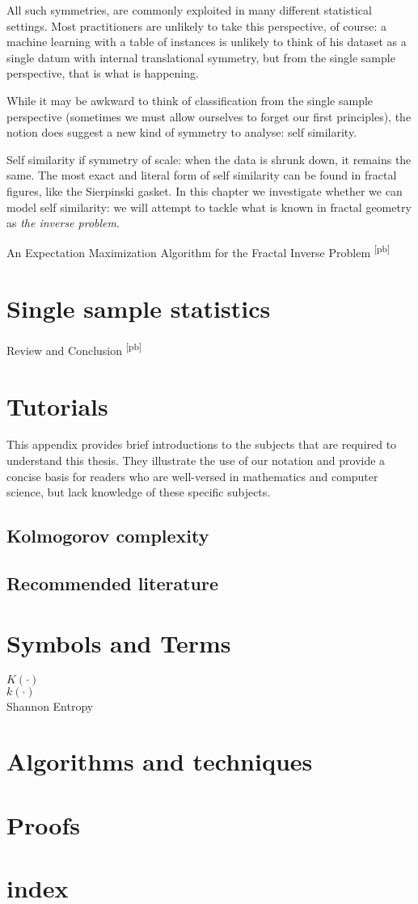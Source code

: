 \documentclass{thesis}
\newcommand{\pb}[1]{\textcolor{OliveGreen}{\small #1 \textsuperscript{[pb]} }}
\begin{document}
All such symmetries, are commonly exploited in many different statistical settings. Most practitioners are unlikely to take this perspective, of course: a machine learning with a table of instances is unlikely to think of his dataset as a single datum with internal translational symmetry, but from the single sample perspective, that is what is happening.

While it may be awkward to think of classification from the single sample perspective (sometimes we must allow ourselves to forget our first principles), the notion does suggest a new kind of symmetry to analyse: self similarity.

Self similarity if symmetry of scale: when the data is shrunk down, it remains the same. The most exact and literal form of self similarity can be found in fractal figures, like the Sierpinski gasket. In this chapter we investigate whether we can model self similarity: we will attempt to tackle what is known in fractal geometry as \emph{the inverse problem}. 

\pb{An Expectation Maximization Algorithm for the Fractal Inverse Problem}

\chapter{Single sample statistics}

\pb{Review and Conclusion}

\appendix
\chapter{Tutorials}
\begin{summary}
This appendix provides brief introductions to the subjects that are required to understand this thesis. They illustrate the use of our notation and provide a concise basis for readers who are well-versed in mathematics and computer science, but lack knowledge of these specific subjects. 
\end{summary}

\section{Kolmogorov complexity}
\section{Recommended literature}

\chapter{Symbols and Terms}

\begin{description}
 \item[$K(\cdot)$]
 \item[$k(\cdot)$]
 \item[Shannon Entropy]
\end{description}

\chapter{Algorithms and techniques}
\chapter{Proofs}
\chapter{index}
\printindex
\end{document}
